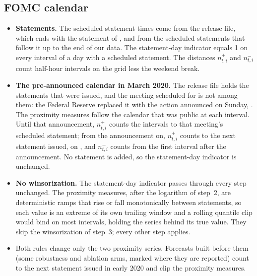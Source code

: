 \subsection{FOMC calendar}
\label{app:rh_dp_fomc}
\begin{itemize}
\item \textbf{Statements.} The scheduled statement times come from the release file, which ends with the statement of
  \rhdsFomcFileLast, and from the \rhdsFomcAdded{} scheduled statements that follow it up to the end of our data. The
  statement-day indicator equals 1 on every interval of a day with a scheduled statement. The distances
  $n^{+}_{t,i}$ and $n^{-}_{t,i}$ count half-hour intervals on the grid less the weekend break.
\item \textbf{The pre-announced calendar in March 2020.} The release file holds the statements that were issued, and
  the meeting scheduled for \rhdsFomcSchedMeeting{} is not among them: the Federal Reserve replaced it with the
  action announced on Sunday, \rhdsFomcReplaced. The proximity measures follow the calendar that was public at each
  interval. Until that announcement, $n^{+}_{t,i}$ counts the intervals to that meeting's scheduled statement; from
  the announcement on, $n^{+}_{t,i}$ counts to the next statement issued, on
  \rhdsFomcNextIssued, and $n^{-}_{t,i}$ counts from the first interval after the announcement. No statement is added,
  so the statement-day indicator is unchanged.
\item \textbf{No winsorization.} The statement-day indicator passes through every step unchanged. The proximity
  measures, after the logarithm of step~2, are deterministic ramps that rise or fall monotonically between
  statements, so each value is an extreme of its own trailing window and a rolling quantile clip would bind on most
  intervals, holding the series behind its true value. They skip the winsorization of step~3; every other step
  applies.
\item Both rules change only the two proximity series. Forecasts built before them (some robustness and ablation
  arms, marked where they are reported) count to the next statement issued in early 2020 and clip the proximity
  measures.
\end{itemize}

